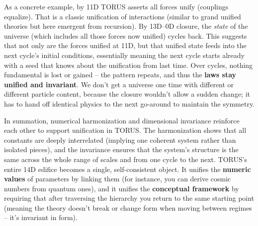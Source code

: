 \documentclass[]{article}
\begin{document}
As a concrete example, by 11D TORUS asserts all forces unify (couplings
equalize)​. That is a classic unification of interactions (similar to
grand unified theories but here emergent from recursion). By 13D--0D
closure, the \emph{state} of the universe (which includes all those
forces now unified) cycles back. This suggests that not only are the
forces unified at 11D, but that unified state feeds into the next
cycle's initial conditions, essentially meaning the next cycle starts
already with a seed that knows about the unification from last time.
Over cycles, nothing fundamental is lost or gained -- the pattern
repeats, and thus the \textbf{laws stay unified and invariant}. We don't
get a universe one time with different \alpha or different particle content,
because the closure wouldn't allow a sudden change; it has to hand off
identical physics to the next go-around to maintain the symmetry.

In summation, numerical harmonization and dimensional invariance
reinforce each other to support unification in TORUS. The harmonization
shows that all constants are deeply interrelated (implying one coherent
system rather than isolated pieces), and the invariance ensures that the
system's structure is the same across the whole range of scales and from
one cycle to the next. TORUS's entire 14D edifice becomes a single,
self-consistent object. It unifies the \textbf{numeric values} of
parameters by linking them (for instance, you can derive cosmic numbers
from quantum ones), and it unifies the \textbf{conceptual framework} by
requiring that after traversing the hierarchy you return to the same
starting point (meaning the theory doesn't break or change form when
moving between regimes -- it's invariant in form).
\end{document}
